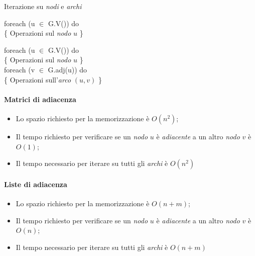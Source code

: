 \begin{code}{Iterazione su \emph{nodi} e \emph{archi}}
\begin{minipage}[t]{0.48\textwidth}
\rmbreak\ind foreach (u $\in$ G.V()) do\\
    \{ Operazioni sul \emph{nodo} $u$ \}
\end{minipage}
\hfill
\begin{minipage}[t]{0.48\textwidth}
\rmbreak\ind foreach (u $\in$ G.V()) do\\
    \{ Operazioni sul \emph{nodo} $u$ \}\\
    \indf foreach (v $\in$ G.adj(u)) do\\
        \{ Operazioni sull'\emph{arco} $(u,v)$ \}\\
\end{minipage}
\end{code}

\noindent\begin{minipage}[t]{0.48\textwidth}
    \paragraph{Matrici di adiacenza}
    \begin{itemize}
        \item Lo spazio richiesto per la memorizzazione è $O(n^2)$;
        \item Il tempo richiesto per verificare se un \emph{nodo} $u$ è
        \emph{adiacente} a un altro \emph{nodo} $v$ è $O(1)$;
        \item Il tempo necessario per iterare su tutti gli \emph{archi} è $O(n^2)$
    \end{itemize}
\end{minipage}
\hfill
\begin{minipage}[t]{0.48\textwidth}
    \paragraph{Liste di adiacenza}
    \begin{itemize}
        \item Lo spazio richiesto per la memorizzazione è $O(n+m)$;
        \item Il tempo richiesto per verificare se un \emph{nodo} $u$ è
        \emph{adiacente} a un altro \emph{nodo} $v$ è $O(n)$;
        \item Il tempo necessario per iterare su tutti gli \emph{archi} è $O(n+m)$
    \end{itemize}
\end{minipage}

